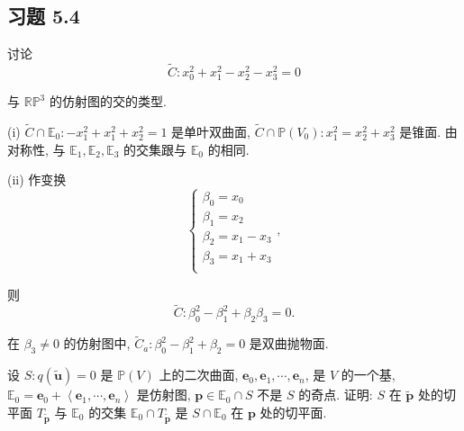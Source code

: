 \documentclass[color=black,device=normal,lang=cn,mode=geye]{elegantnote}
\begin{document}
\subsection{习题 5.4}
\begin{exercise}%
    讨论
    \[\widetilde{C}:x_0^2+x_1^2-x_2^2-x_3^2=0\]

    与 $\mathbb{RP}^3$ 的仿射图的交的类型.
\end{exercise}
\begin{solution}
    (i) $\widetilde{C}\cap\mathbb{E}_0:-x_1^2+x_1^2+x_2^2=1$ 是单叶双曲面, $\widetilde{C}\cap\mathbb{P}(V_0):x_1^2=x_2^2+x_3^2$ 是锥面. 由对称性, 与 $\mathbb{E}_1,\mathbb{E}_2,\mathbb{E}_3$ 的交集跟与 $\mathbb{E}_0$ 的相同.

    (ii) 作变换
    \[\begin{cases}
        \beta_0=x_0 \\
        \beta_1=x_2 \\
        \beta_2=x_1-x_3 \\
        \beta_3=x_1+x_3 \\
    \end{cases},\]

    则
    \[\widetilde{C}:\beta_0^2-\beta_1^2+\beta_2\beta_3=0.\]

    在 $\beta_3\neq0$ 的仿射图中, $\widetilde{C}_a:\beta_0^2-\beta_1^2+\beta_2=0$ 是双曲抛物面.
\end{solution}
\begin{exercisec}\label{exc1}
    设 $S:q(\tilde{\boldsymbol{u}})=0$ 是 $\mathbb{P}(V)$ 上的二次曲面, $\boldsymbol{e}_0,\boldsymbol{e}_1,\cdots,\boldsymbol{e}_n$, 是 $V$ 的一个基, $\mathbb{E}_0=\boldsymbol{e}_0+\left<\boldsymbol{e}_1,\cdots,\boldsymbol{e}_n\right>$ 是仿射图, $\boldsymbol{p}\in\mathbb{E}_0\cap S$ 不是 $S$ 的奇点. 证明: $S$ 在 $\tilde{\boldsymbol{p}}$ 处的切平面 $T_{\tilde{\boldsymbol{p}}}$ 与 $\mathbb{E}_0$ 的交集 $\mathbb{E}_0\cap T_{\tilde{\boldsymbol{p}}}$ 是 $S\cap\mathbb{E}_0$ 在 $\boldsymbol{p}$ 处的切平面.
\end{exercisec}
\end{document}

